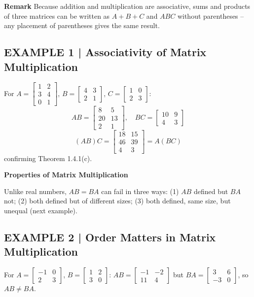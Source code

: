 \documentclass{article}
\newcommand{\redheading}[1]{{\vspace{2mm}\noindent\Large\bfseries\color{red!55!black} #1\par}\vspace{2mm}}
\theoremstyle{mystyle}
\begin{document}
\textbf{Remark} Because addition and multiplication are associative, sums and products of three matrices can be written as $A+B+C$ and $ABC$ without parentheses -- any placement of parentheses gives the same result.

\subsection*{EXAMPLE 1 | Associativity of Matrix Multiplication}
For $A=\begin{bmatrix}1&2\\3&4\\0&1\end{bmatrix}$, $B=\begin{bmatrix}4&3\\2&1\end{bmatrix}$, $C=\begin{bmatrix}1&0\\2&3\end{bmatrix}$:
\[
AB=\begin{bmatrix}8&5\\20&13\\2&1\end{bmatrix},\quad BC=\begin{bmatrix}10&9\\4&3\end{bmatrix}
\]
\[
(AB)C=\begin{bmatrix}18&15\\46&39\\4&3\end{bmatrix}=A(BC)
\]
confirming Theorem 1.4.1(c).

\redheading{Properties of Matrix Multiplication}

Unlike real numbers, $AB=BA$ can fail in three ways: (1) $AB$ defined but $BA$ not; (2) both defined but of different sizes; (3) both defined, same size, but unequal (next example).

\subsection*{EXAMPLE 2 | Order Matters in Matrix Multiplication}
For $A=\begin{bmatrix}-1&0\\2&3\end{bmatrix}$, $B=\begin{bmatrix}1&2\\3&0\end{bmatrix}$: $AB=\begin{bmatrix}-1&-2\\11&4\end{bmatrix}$ but $BA=\begin{bmatrix}3&6\\-3&0\end{bmatrix}$, so $AB\ne BA$.
\end{document}
